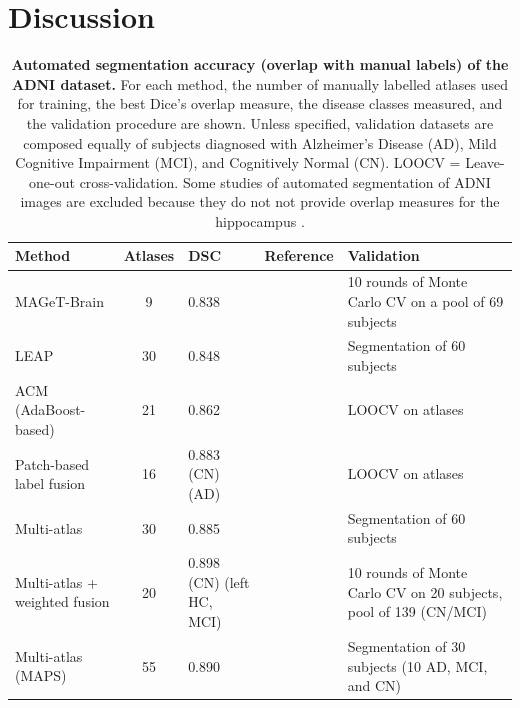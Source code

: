 \documentclass{article}\usepackage{graphicx, color}
\newcommand{\mb}{MAGeT-Brain }
\begin{document}
\FloatBarrier

\section{Discussion}
%



%
%



\begin{table}[!tbp]
\scriptsize
\caption{\textbf{Automated segmentation accuracy (overlap with manual labels) of the 
   ADNI dataset.} For each method, the number of manually labelled atlases used for 
   training, the best Dice's overlap measure, the disease classes measured, and 
   the validation procedure are shown. Unless specified, validation datasets are
   composed equally of subjects diagnosed with Alzheimer's Disease (AD), Mild 
   Cognitive Impairment (MCI), and Cognitively Normal (CN). LOOCV = Leave-one-out 
   cross-validation. 
   Some studies of automated segmentation of ADNI images are excluded because they 
   do not not provide overlap measures for the hippocampus \cite{Heckemann2011,Chupin2009}.
  \label{tab:other-methods}} 
\begin{center}
\begin{tabular}{ l  c  p{1in}  l  p{2in}  }
\hline\hline
Method & Atlases & DSC & Reference & Validation \tabularnewline
\hline
\mb                     &9 & 0.838 & & 10 rounds of Monte Carlo CV on a pool of 69 subjects \tabularnewline
LEAP                    &30&0.848                 &\cite{Wolz2010}  &Segmentation of 60 subjects\tabularnewline
ACM (AdaBoost-based)    &21&0.862                 &\cite{Morra2008} &LOOCV on atlases\tabularnewline
Patch-based label fusion&16&0.883 (CN) \newline 0.838 (AD)&\cite{Coupe2011e}&LOOCV on atlases\tabularnewline
Multi-atlas             &30&0.885                 &\cite{Lotjonen2010}&Segmentation of 60 subjects\tabularnewline
Multi-atlas + weighted fusion&20&0.898 (CN) \newline 0.798 (left HC, MCI) &\cite{Wang2011}  &10 rounds of Monte Carlo CV on 20 subjects, pool of 139 (CN/MCI)\tabularnewline
Multi-atlas (MAPS)    &55&0.890                   &\cite{Leung2010}&Segmentation of 30 subjects (10 AD, MCI, and CN)\tabularnewline
\hline
\end{tabular}
\end{center}
\end{table}
\end{document}
